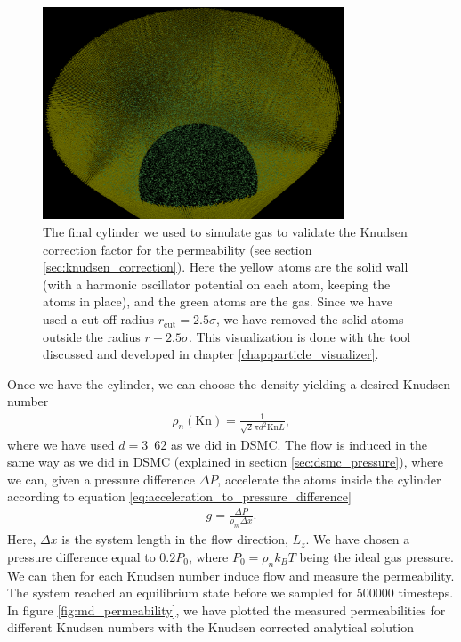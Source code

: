 \begin{figure}[h!]
\begin{center}
\includegraphics[width=0.8\textwidth, trim=0cm 0cm 0cm 0cm, clip]{MD/figures/md_cylinder.png}
\end{center}
\caption{The final cylinder we used to simulate gas to validate the Knudsen correction factor for the permeability (see section \ref{sec:knudsen_correction}). Here the yellow atoms are the solid wall (with a harmonic oscillator potential on each atom, keeping the atoms in place), and the green atoms are the gas. Since we have used a cut-off radius $r_\text{cut}=2.5\sigma$, we have removed the solid atoms outside the radius $r+2.5\sigma$. This visualization is done with the tool discussed and developed in chapter \ref{chap:particle_visualizer}.}
\label{fig:md_cylinder}
\end{figure}
Once we have the cylinder, we can choose the density yielding a desired Knudsen number
\begin{align}
	\rho_n(\text{Kn}) = \frac{1}{\sqrt 2 \pi d^2 \text{Kn}L},
\end{align}
where we have used $d=$\unit{3.62}{\angstrom} as we did in DSMC. The flow is induced in the same way as we did in DSMC (explained in section \ref{sec:dsmc_pressure}), where we can, given a pressure difference $\Delta P$, accelerate the atoms inside the cylinder according to equation \eqref{eq:acceleration_to_pressure_difference}
\begin{align*}
	g = \frac{\Delta P}{\rho_m\Delta x}.
\end{align*}
Here, $\Delta x$ is the system length in the flow direction, $L_z$. We have chosen a pressure difference equal to $0.2P_0$, where $P_0=\rho_nk_BT$ being the ideal gas pressure. We can then for each Knudsen number induce flow and measure the permeability. The system reached an equilibrium state before we sampled for $500000$ timesteps. In figure \ref{fig:md_permeability}, we have plotted the measured permeabilities for different Knudsen numbers with the Knudsen corrected analytical solution
